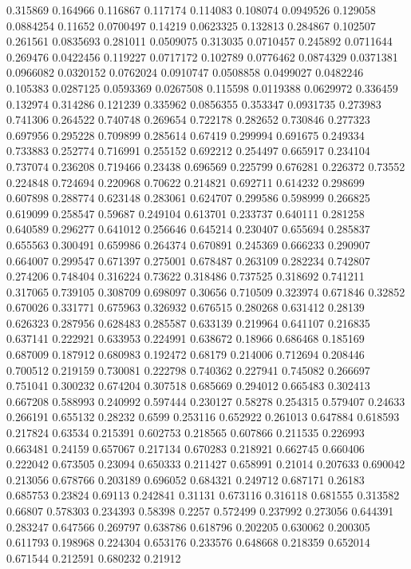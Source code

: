 0.315869 0.164966
0.116867 0.117174
0.114083 0.108074
0.0949526 0.129058
0.0884254 0.11652
0.0700497 0.14219
0.0623325 0.132813
0.284867 0.102507
0.261561 0.0835693
0.281011 0.0509075
0.313035 0.0710457
0.245892 0.0711644
0.269476 0.0422456
0.119227 0.0717172
0.102789 0.0776462
0.0874329 0.0371381
0.0966082 0.0320152
0.0762024 0.0910747
0.0508858 0.0499027
0.0482246 0.105383
0.0287125 0.0593369
0.0267508 0.115598
0.0119388 0.0629972
0.336459 0.132974
0.314286 0.121239
0.335962 0.0856355
0.353347 0.0931735
0.273983 0.741306
0.264522 0.740748
0.269654 0.722178
0.282652 0.730846
0.277323 0.697956
0.295228 0.709899
0.285614 0.67419
0.299994 0.691675
0.249334 0.733883
0.252774 0.716991
0.255152 0.692212
0.254497 0.665917
0.234104 0.737074
0.236208 0.719466
0.23438 0.696569
0.225799 0.676281
0.226372 0.73552
0.224848 0.724694
0.220968 0.70622
0.214821 0.692711
0.614232 0.298699
0.607898 0.288774
0.623148 0.283061
0.624707 0.299586
0.598999 0.266825
0.619099 0.258547
0.59687 0.249104
0.613701 0.233737
0.640111 0.281258
0.640589 0.296277
0.641012 0.256646
0.645214 0.230407
0.655694 0.285837
0.655563 0.300491
0.659986 0.264374
0.670891 0.245369
0.666233 0.290907
0.664007 0.299547
0.671397 0.275001
0.678487 0.263109
0.282234 0.742807
0.274206 0.748404
0.316224 0.73622
0.318486 0.737525
0.318692 0.741211
0.317065 0.739105
0.308709 0.698097
0.30656 0.710509
0.323974 0.671846
0.32852 0.670026
0.331771 0.675963
0.326932 0.676515
0.280268 0.631412
0.28139 0.626323
0.287956 0.628483
0.285587 0.633139
0.219964 0.641107
0.216835 0.637141
0.222921 0.633953
0.224991 0.638672
0.18966 0.686468
0.185169 0.687009
0.187912 0.680983
0.192472 0.68179
0.214006 0.712694
0.208446 0.700512
0.219159 0.730081
0.222798 0.740362
0.227941 0.745082
0.266697 0.751041
0.300232 0.674204
0.307518 0.685669
0.294012 0.665483
0.302413 0.667208
0.588993 0.240992
0.597444 0.230127
0.58278 0.254315
0.579407 0.24633
0.266191 0.655132
0.28232 0.6599
0.253116 0.652922
0.261013 0.647884
0.618593 0.217824
0.63534 0.215391
0.602753 0.218565
0.607866 0.211535
0.226993 0.663481
0.24159 0.657067
0.217134 0.670283
0.218921 0.662745
0.660406 0.222042
0.673505 0.23094
0.650333 0.211427
0.658991 0.21014
0.207633 0.690042
0.213056 0.678766
0.203189 0.696052
0.684321 0.249712
0.687171 0.26183
0.685753 0.23824
0.69113 0.242841
0.31131 0.673116
0.316118 0.681555
0.313582 0.66807
0.578303 0.234393
0.58398 0.2257
0.572499 0.237992
0.273056 0.644391
0.283247 0.647566
0.269797 0.638786
0.618796 0.202205
0.630062 0.200305
0.611793 0.198968
0.224304 0.653176
0.233576 0.648668
0.218359 0.652014
0.671544 0.212591
0.680232 0.21912
